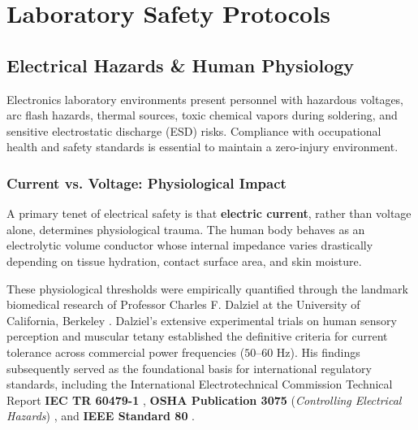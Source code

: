 \chapter{Laboratory Safety Protocols}

\section{Electrical Hazards \& Human Physiology}
Electronics laboratory environments present personnel with hazardous voltages, arc flash hazards, thermal sources, toxic chemical vapors during soldering, and sensitive electrostatic discharge (ESD) risks. Compliance with occupational health and safety standards \cite{yildiz2010approach, bicol_university_safety} is essential to maintain a zero-injury environment.

\subsection{Current vs. Voltage: Physiological Impact}
A primary tenet of electrical safety is that \textbf{electric current}, rather than voltage alone, determines physiological trauma. The human body behaves as an electrolytic volume conductor whose internal impedance varies drastically depending on tissue hydration, contact surface area, and skin moisture.

These physiological thresholds were empirically quantified through the landmark biomedical research of Professor Charles F. Dalziel at the University of California, Berkeley \cite{dalziel1968lethal}. Dalziel's extensive experimental trials on human sensory perception and muscular tetany established the definitive criteria for current tolerance across commercial power frequencies ($50\text{--}60\text{ Hz}$). His findings subsequently served as the foundational basis for international regulatory standards, including the International Electrotechnical Commission Technical Report \textbf{IEC TR 60479-1} \cite{iec60479_1}, \textbf{OSHA Publication 3075} (\textit{Controlling Electrical Hazards}) \cite{osha3075}, and \textbf{IEEE Standard 80} \cite{ieee80}.

